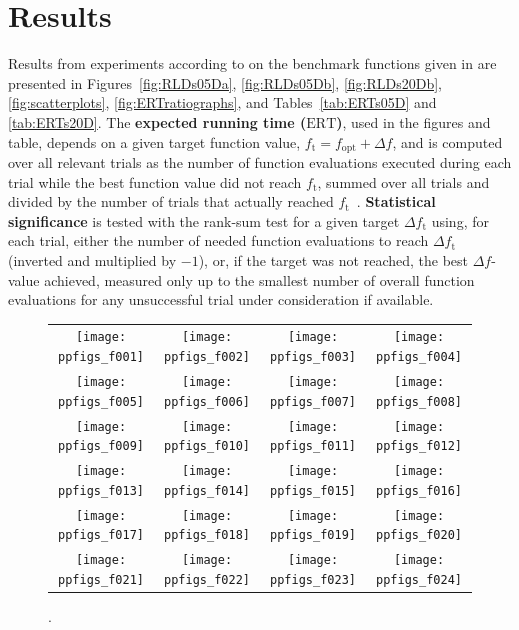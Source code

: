 \documentclass{article}
\newcommand{\ERT}{\ensuremath{\mathrm{ERT}}}
\newcommand{\Df}{\ensuremath{\Delta f}}
\newcommand{\fopt}{\ensuremath{f_\mathrm{opt}}}
\newcommand{\ftarget}{\ensuremath{f_\mathrm{t}}}
\newcommand{\bbobdatapath}{ppdata/} %
\begin{document}
\section{Results}
Results from experiments according to \cite{hansen2010exp} on the benchmark
functions given in \cite{wp200901_2010,hansen2010fun} are presented in
Figures~\ref{fig:RLDs05Da}, \ref{fig:RLDs05Db}, \ref{fig:RLDs20Db}, \ref{fig:scatterplots}, \ref{fig:ERTratiographs}, and
Tables~\ref{tab:ERTs05D} and \ref{tab:ERTs20D}.
The \textbf{expected running time (\ERT)}, used in the figures and table,
depends on a given target function value, $\ftarget=\fopt+\Df$, and is computed
over all relevant trials as the number of function evaluations executed during
each trial while the best function value did not reach \ftarget, summed over
all trials and divided by the number of trials that actually reached \ftarget\
\cite{hansen2010exp,price1997dev}.
\textbf{Statistical significance} is tested with the rank-sum test for a given
target $\Delta\ftarget$ using, for each trial, either the number of needed
function evaluations to reach $\Delta\ftarget$ (inverted and multiplied by
$-1$), or, if the target was not reached, the best $\Df$-value achieved,
measured only up to the smallest number of overall function evaluations for any
unsuccessful trial under consideration if available.
\begin{figure}
\centering
\begin{tabular}{@{}c@{}c@{}c@{}c@{}}
\texttt{[image: ppfigs\_f001]}&
\texttt{[image: ppfigs\_f002]}&
\texttt{[image: ppfigs\_f003]}&
\texttt{[image: ppfigs\_f004]}\\
\texttt{[image: ppfigs\_f005]}&
\texttt{[image: ppfigs\_f006]}&
\texttt{[image: ppfigs\_f007]}&
\texttt{[image: ppfigs\_f008]}\\
\texttt{[image: ppfigs\_f009]}&
\texttt{[image: ppfigs\_f010]}&
\texttt{[image: ppfigs\_f011]}&
\texttt{[image: ppfigs\_f012]}\\
\texttt{[image: ppfigs\_f013]}&
\texttt{[image: ppfigs\_f014]}&
\texttt{[image: ppfigs\_f015]}&
\texttt{[image: ppfigs\_f016]}\\
\texttt{[image: ppfigs\_f017]}&
\texttt{[image: ppfigs\_f018]}&
\texttt{[image: ppfigs\_f019]}&
\texttt{[image: ppfigs\_f020]}\\
\texttt{[image: ppfigs\_f021]}&
\texttt{[image: ppfigs\_f022]}&
\texttt{[image: ppfigs\_f023]}&
\texttt{[image: ppfigs\_f024]}
\end{tabular}
\vspace*{-0.2cm}
\caption[Expected running time divided by dimension versus dimension]{
\label{fig:scaling}
.  %
% 
}
\end{figure}
\end{document}

